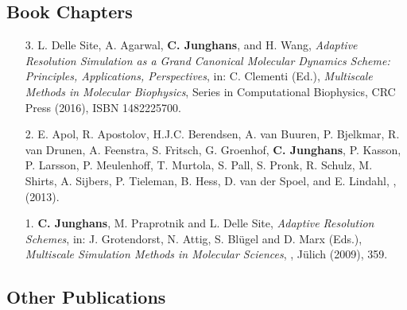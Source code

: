 \documentclass{article}
\begin{document}
\subsection*{Book Chapters}

\begin{enumerate}
\item[3.] L. Delle Site, A. Agarwal, \textbf{C. Junghans}, and H. Wang, 
  \textit{Adaptive Resolution Simulation as a Grand Canonical Molecular Dynamics Scheme: Principles, Applications, Perspectives},
  in: C. Clementi (Ed.),
  \textit{Multiscale Methods in Molecular Biophysics},
  Series in Computational Biophysics, CRC Press (2016), ISBN 1482225700.

\item[2.] E. Apol, R. Apostolov, H.J.C. Berendsen, A. van Buuren, P. Bjelkmar, R. van Drunen, A. Feenstra, S. Fritsch, G. Groenhof, \textbf{C. Junghans}, P. Kasson, P. Larsson, P. Meulenhoff, T. Murtola, S. Pall, S. Pronk, R. Schulz, M. Shirts, A. Sijbers, P. Tieleman, B. Hess, D. van der Spoel, and E. Lindahl, 
  \textit{},
   (2013).

\item[1.] \textbf{C. Junghans}, M. Praprotnik and L. Delle Site,
  \textit{Adaptive Resolution Schemes},
  in: J. Grotendorst, N. Attig, S. Bl{\"u}gel and D. Marx (Eds.),
  \textit{Multiscale Simulation Methods in Molecular Sciences}, , J{\"u}lich (2009), 359.
\end{enumerate}

\subsection*{Other Publications}
\end{document}
